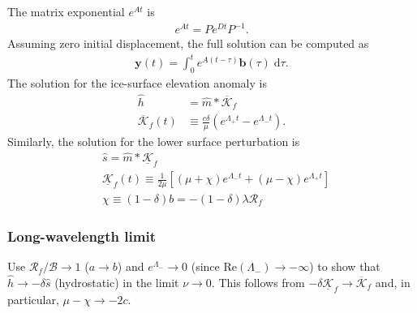 \documentclass[paper=a4, fontsize=11pt]{article}
\begin{document}
The matrix exponential $e^{{A}t}$ is
\begin{align}
e^{{A}t} = {P}e^{{D}t}{P}^{-1}.
\end{align}
Assuming zero initial displacement, the full solution can be computed as
\begin{align}
\pmb{y}(t) = \int_0^t e^{{A}(t-\tau)} \pmb{b}(\tau)\;\mathrm{d}\tau. \label{ysol}
\end{align}
The solution for the ice-surface elevation anomaly is
\begin{align}
\widehat{h} &= \widehat{m} * \overline{\mathcal{K}}_f\\
\overline{\mathcal{K}}_f(t)  &\equiv  \frac{c\delta}{\mu}(e^{\Lambda_+ t}-e^{\Lambda_-t}).
\end{align}
Similarly, the solution for the lower surface perturbation is
\begin{align}
  &\widehat{s} = \widehat{m} * \underline{\mathcal{K}}_f\\
 &\underline{\mathcal{K}}_f(t)  \equiv  \frac{1}{2\mu}[(\mu+\chi)e^{\Lambda_- t}+(\mu-\chi)e^{\Lambda_+t}]\\
  &\chi \equiv (1-\delta)b = -(1-\delta)\lambda\mathcal{R}_f
\end{align}

\subsubsection*{Long-wavelength limit}
Use $\mathcal{R}_f/\mathcal{B}\to 1$ ($a\to b$)
and $e^{\Lambda_-}\to 0$ (since $\mathrm{Re}(\Lambda_-)\to-\infty$) to show that $\widehat{h}\to -\delta\widehat{s}$ (hydrostatic)
in the limit $\nu\to 0$. This follows from $-\delta\underline{\mathcal{K}}_f \to  \overline{\mathcal{K}}_f$
and, in particular, $\mu-\chi \to -2c$.
\end{document}
